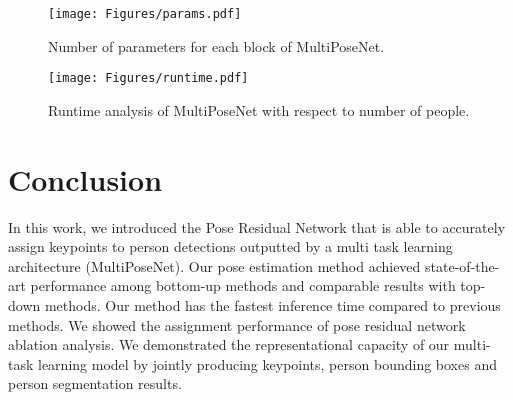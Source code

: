 \documentclass[runningheads]{llncs}
\begin{document}
\begin{figure}[!tbp]
  \centering
  \begin{minipage}[b]{0.47\textwidth}
    \texttt{[image: Figures/params.pdf]}
    \caption{Number of parameters for each block of MultiPoseNet.}
   \label{fig:params}
  \end{minipage}
  \hfill
  \begin{minipage}[b]{0.47\textwidth}
    \texttt{[image: Figures/runtime.pdf]}
    \caption{Runtime analysis of MultiPoseNet with respect to number of people.}
   \label{fig:runtime}
  \end{minipage}
\end{figure}






\section{Conclusion} 
In this work, we introduced the Pose Residual Network that is able to accurately assign keypoints to  person detections outputted by a multi task learning architecture (MultiPoseNet). Our pose estimation method achieved state-of-the-art performance among bottom-up methods and comparable results with top-down methods. Our method has  the fastest inference time compared to previous methods.  We showed the assignment performance of pose residual network  ablation analysis. We demonstrated the representational capacity of our multi-task learning model by jointly producing keypoints, person bounding boxes and person segmentation results.
\pagebreak


\end{document}
